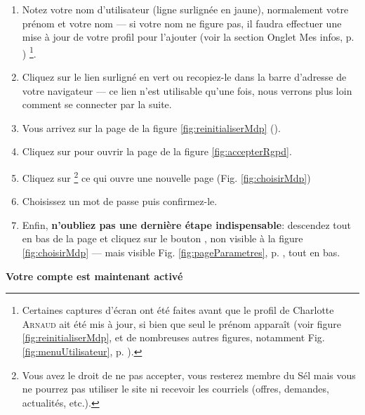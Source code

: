 \begin{enumerate}
    \item Notez votre nom d’utilisateur (ligne surlignée en jaune), normalement votre prénom et votre nom --- si votre nom ne figure pas, il faudra effectuer une mise à jour de votre profil pour l'ajouter (voir la section \og{}Onglet Mes infos\fg, p. \pageref{page:completerInfosPerso})
    \footnote{\setcounter{noteProfilPasAJour}{\value{footnote}}\label{page:profilPasAJour}Certaines captures d'écran ont été faites avant que le profil de Charlotte \textsc{Arnaud} ait été mis à jour, si bien que seul le prénom apparaît (voir figure  \vref{fig:reinitialiserMdp}, et de nombreuses autres figures, notamment Fig. \ref{fig:menuUtilisateur}, p. \pageref{fig:menuUtilisateur}).}. 
    \item Cliquez sur le lien surligné en vert ou recopiez-le dans la barre d’adresse de votre navigateur ---  ce lien n’est utilisable qu'une fois, nous verrons plus loin  comment se connecter par la suite.
    \item Vous arrivez sur la page de la figure \ref{fig:reinitialiserMdp} ().
    \item Cliquez sur  pour ouvrir la page de la figure \ref{fig:accepterRgpd}.
    \item Cliquez sur \label{page:accepteRgpd}
    \footnote{Vous avez le droit de ne pas accepter, vous resterez membre du Sél mais vous ne pourrez pas utiliser le site ni recevoir les courriels (offres, demandes, actualités, etc.).} 
    ce qui ouvre une nouvelle page (Fig. \vref{fig:choisirMdp})
    \item Choisissez un mot de passe puis confirmez-le.
    \item Enfin, \textbf{n’oubliez pas une dernière étape indispensable}: descendez tout en bas de la page et cliquez sur le bouton , non visible à la figure \ref{fig:choisirMdp} --- mais visible Fig. \ref{fig:pageParametres}, p. \pageref{fig:pageParametres}, tout en bas.
\end{enumerate}

\medskip

\begin{center}
    \textbf{Votre compte est maintenant activé}
\end{center}

